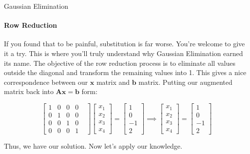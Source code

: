 \documentclass{beamer}
\begin{document}
\begin{frame}{Gaussian Elimination}
\framesubtitle{Row Reduction}
If you found that to be painful, substitution is far worse. You're welcome to give it a try. This is where you'll truly understand why Gaussian Elimination earned its name. The objective of the row reduction process is to eliminate all values outside the diagonal and transform the remaining values into 1. This gives a nice correspondence between our $\mathbf{x}$ matrix and $\mathbf{b}$ matrix. Putting our augmented matrix back into $\mathbf{A}\mathbf{x}=\mathbf{b}$ form:

\[
\begin{bmatrix}
    1 & 0 & 0 & 0 & \\
    0 & 1 & 0 & 0 & \\
    0 & 0 & 1 & 0 & \\
    0 & 0 & 0 & 1 & 
\end{bmatrix}
\begin{bmatrix}
    x_1 \\
    x_2 \\
    x_3 \\
    x_4
\end{bmatrix}
=
\begin{bmatrix}
    1 \\
    0 \\
    -1 \\
    2
\end{bmatrix}
\implies
\begin{bmatrix}
    x_1 \\
    x_2 \\
    x_3 \\
    x_4
\end{bmatrix}
=
\begin{bmatrix}
    1 \\
    0 \\
    -1 \\
    2
\end{bmatrix}
\]

Thus, we have our solution. Now let's apply our knowledge.
\end{frame}
\end{document}
